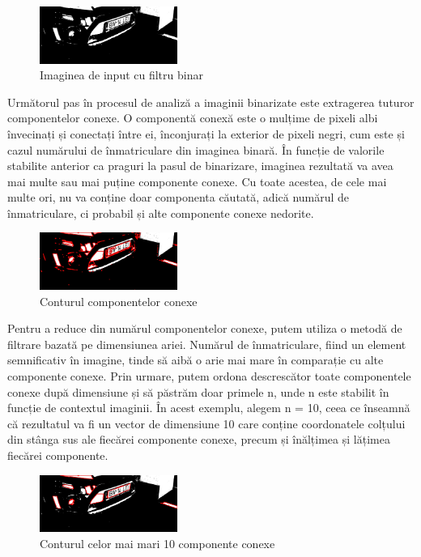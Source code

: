 \documentclass[a4paper,12pt]{report}
\begin{document}
\begin{figure}[h!]
    \centering
    \includegraphics[width=0.4\textwidth]{images/binary.jpg}
    \caption{Imaginea de input cu filtru binar}
\end{figure}
\FloatBarrier

Următorul pas în procesul de analiză a imaginii binarizate este extragerea tuturor componentelor conexe. O componentă conexă este o mulțime de pixeli albi învecinați și conectați între ei, înconjurați la exterior de pixeli negri, cum este și cazul numărului de înmatriculare din imaginea binară. În funcție de valorile stabilite anterior ca praguri la pasul de binarizare, imaginea rezultată va avea mai multe sau mai puține componente conexe. Cu toate acestea, de cele mai multe ori, nu va conține doar componenta căutată, adică numărul de înmatriculare, ci probabil și alte componente conexe nedorite.

\begin{figure}[h!]
    \centering
    \includegraphics[width=0.4\textwidth]{images/all_connected_components.jpg}
    \caption{Conturul componentelor conexe}
\end{figure}
\FloatBarrier

Pentru a reduce din numărul componentelor conexe, putem utiliza o metodă de filtrare bazată pe dimensiunea ariei. Numărul de înmatriculare, fiind un element semnificativ în imagine, tinde să aibă o arie mai mare în comparație cu alte componente conexe. Prin urmare, putem ordona descrescător toate componentele conexe după dimensiune și să păstrăm doar primele n, unde n este stabilit în funcție de contextul imaginii. În acest exemplu, alegem n = 10, ceea ce înseamnă că rezultatul va fi un vector de dimensiune 10 care conține coordonatele colțului din stânga sus ale fiecărei componente conexe, precum și înălțimea și lățimea fiecărei componente.

\begin{figure}[h!]
    \centering
    \includegraphics[width=0.4\textwidth]{images/connected_components.jpg}
    \caption{Conturul celor mai mari 10 componente conexe}
\end{figure}
\FloatBarrier
\end{document}
